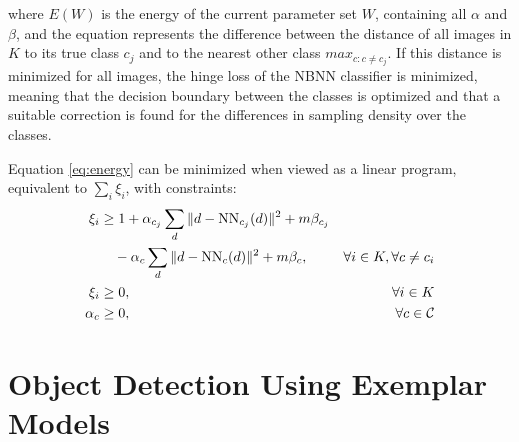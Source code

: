 \documentclass[a4paper,10pt]{article}
\begin{document}
where $E(W)$ is the energy of the current parameter set $W$, containing all $\alpha$ and $\beta$, and the equation represents the difference between the distance of all images in $K$ to its true class $c_j$ and to the nearest other class $max_{c:c\neq c_j}$. If this distance is minimized for all images, the hinge loss of the NBNN classifier is minimized, meaning that the decision boundary between the classes is optimized and that a suitable correction is found for the differences in sampling density over the classes.

Equation \eqref{eq:energy} can be minimized when viewed as a linear program, equivalent to $\sum_i \xi_i$, with constraints:
\begin{align}
    \xi_i &\geq 1 +\alpha_{c_j} \sum_d \|d - \text{NN}_{c_j}(d)\|^2 + m\beta_{c_j}&\notag\\
    \label{eq:linprog1}
    &\quad-\alpha_{c} \sum_d \|d - \text{NN}_{c}(d)\|^2 + m\beta_{c}, &\forall i \in K, \forall c \neq c_i\\
    \label{eq:linprog2}
    \xi_i &\geq 0, &\forall i \in K\\
    \label{eq:linprog3}
    \alpha_c &\geq 0, &\forall c \in \mathcal{C}
\end{align}



\section{Object Detection Using Exemplar Models} %
\label{sec:object_detection}

\begin{figure}[hbt]
    \centering
\end{figure}
\end{document}
